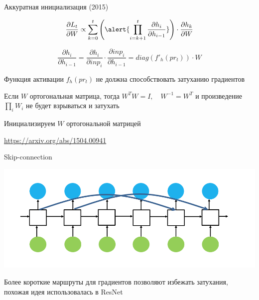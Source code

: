\documentclass[notes,12pt, aspectratio=169]{beamer}
\newenvironment{wideitemize}{\itemize\addtolength{\itemsep}{10pt}}{\enditemize}
\begin{document}
\begin{frame}{Аккуратная инициализация (2015)}
		
		\[\frac{\partial L_t}{\partial W}  \propto \sum_{k=0}^t \left( \alert{\prod_{i=k+1}^t  \frac{\partial h_i}{\partial h_{i-1}}} \right) \cdot  \frac{\partial h_k}{\partial W} \]
				
		\[
		\frac{\partial h_i}{\partial h_{i-1}} = \frac{\partial h_i}{\partial inp_i} \cdot \frac{\partial inp_i}{\partial h_{i-1}} = diag(f'_h(pr_t)) \cdot W
		\]
	
	\begin{wideitemize} 
		\item Функция активации $f_h(pr_t)$ не должна способствовать затуханию градиентов
		
		\item Если $W$ ортогональная матрица, тогда $W^T W = I, \quad W^{-1} = W^T$ и  произведение $\prod_i W_i$ не будет взрываться и затухать %
	
		\item Инициализируем $W$ ортогональной матрицей
	\end{wideitemize} 
	
	\vfill 
	\footnotesize 
	\color{blue} \url{https://arxiv.org/abs/1504.00941} 
\end{frame}


\begin{frame}{Skip-connection}
	\begin{center}
		\includegraphics[width=.9\linewidth]{rnn13.png}
	\end{center}

	\begin{wideitemize} 
	\item  Более короткие маршруты для градиентов позволяют избежать затухания, похожая идея использовалась в ResNet
	\end{wideitemize} 
\end{frame}
\end{document}
